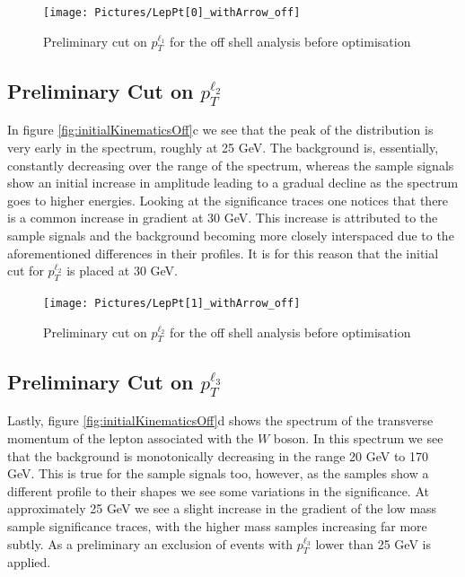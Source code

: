 \begin{figure}[H] %
   \centering
   \texttt{[image: Pictures/LepPt[0]\_withArrow\_off]} 
   \caption{Preliminary cut on $p_{T}^{\ell_{1}}$ for the off shell analysis before optimisation}
   \label{fig:example}
\end{figure}

\subsection{Preliminary Cut on $p_{T}^{\ell_{2}}$}

In figure \ref{fig:initialKinematicsOff}c we see that the peak of the distribution is very early in the spectrum, roughly at 25 GeV.
The background is, essentially, constantly decreasing over the range of the spectrum, whereas the sample signals show an initial increase in amplitude leading to a gradual decline as the spectrum goes to higher energies.
Looking at the significance traces one notices that there is a common increase in gradient at 30 GeV.
This increase is attributed to the sample signals and the background becoming more closely interspaced due to the aforementioned differences in their profiles.
It is for this reason that the initial cut for $p_{T}^{\ell_{2}}$ is placed at 30 GeV.

\begin{figure}[H] %
   \centering
   \texttt{[image: Pictures/LepPt[1]\_withArrow\_off]} 
   \caption{Preliminary cut on $p_{T}^{\ell_{2}}$ for the off shell analysis before optimisation}
   \label{fig:example}
\end{figure}

\subsection{Preliminary Cut on $p_{T}^{\ell_{3}}$}

Lastly, figure \ref{fig:initialKinematicsOff}d shows the spectrum of the transverse momentum of the lepton associated with the $W$ boson.
In this spectrum we see that the background is monotonically decreasing in the range 20 GeV to 170 GeV.
This is true for the sample signals too, however, as the samples show a different profile to their shapes we see some variations in the significance.
At approximately 25 GeV we see a slight increase in the gradient of the low mass sample significance traces, with the higher mass samples increasing far more subtly.
As a preliminary an exclusion of events with $p_{T}^{\ell_{3}}$ lower than 25 GeV is applied.

